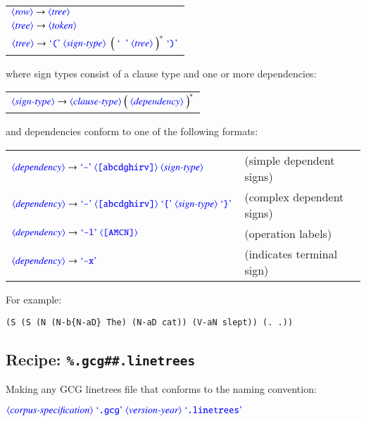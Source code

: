 \documentclass[12pt]{report}
\def\blue{\color{blue}}
\def\magenta{\color{magenta}}
\begin{document}
\begin{tabular}{l}
$\dtype{row}  \rightarrow \dtype{tree}$
\\
$\dtype{tree} \rightarrow \dtype{token}$
\\
$\dtype{tree} \rightarrow \dcode{(} \ \dtype{sign-type} \ \ {\Big( \ \dcode{\ } \ \dtype{tree} \ \Big)^+} \ \dcode{)}$
\end{tabular}

where sign types consist of a clause type and one or more dependencies:

\begin{tabular}{l}
$\dtype{sign-type}  \rightarrow \dtype{clause-type} \ {\Big( \ \dtype{dependency} \ \Big)^*}$
\end{tabular}

and dependencies conform to one of the following formats:

\begin{tabular}{ll}
$\dtype{dependency} \rightarrow \dcode{-} \ \dexpr{[abcdghirv]} \ \dtype{sign-type}$                             & (simple dependent signs)
\\
$\dtype{dependency} \rightarrow \dcode{-} \ \dexpr{[abcdghirv]} \ \dcode{\{} \ \dtype{sign-type} \ \dcode{\}}$   & (complex dependent signs)
\\
$\dtype{dependency} \rightarrow \dcode{-l} \ \dexpr{[AMCN]}$                                                     & (operation labels)
\\
$\dtype{dependency} \rightarrow \dcode{-x}$                                                                      &  (indicates terminal sign)
\end{tabular}

For example:

{\magenta\begin{verbatim}
(S (S (N (N-b{N-aD} The) (N-aD cat)) (V-aN slept)) (. .))
\end{verbatim}
}

\subsection{Recipe: {\blue\tt \%.gcg\#\#.linetrees}}

Making any GCG linetrees file that conforms to the naming convention:

$\dtype{corpus-specification} \ \dcode{.gcg} \ \dtype{version-year} \ \dcode{.linetrees}$
\end{document}
